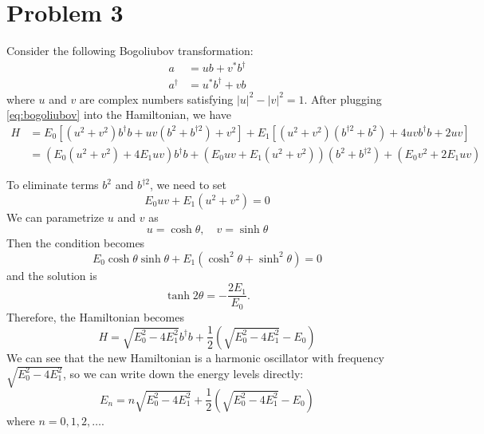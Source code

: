\documentclass{article}
\begin{document}
\section*{Problem 3}
Consider the following Bogoliubov transformation:
\begin{subequations}\label{eq:bogoliubov}
    \begin{align}
        a&=ub+v^*b^\dagger\\
        a^\dagger&=u^*b^\dagger+vb
    \end{align}
\end{subequations}
where $u$ and $v$ are complex numbers satisfying $|u|^2-|v|^2=1$.
After plugging \cref{eq:bogoliubov} into the Hamiltonian, we have
\begin{equation}
    \begin{split}
        H&=E_0\left[(u^2+v^2)b^\dagger b+uv(b^2+b^{\dagger 2})+v^2\right]+E_1\left[(u^2+v^2)(b^{\dagger 2}+b^2)+4uvb^\dagger b+2uv\right]\\
         &= (E_0(u^2+v^2)+4E_1uv)b^\dagger b+(E_0uv+E_1(u^2+v^2))(b^2+b^{\dagger 2})+(E_0v^2+2E_1uv)
    \end{split}
\end{equation}

To eliminate terms $b^2$ and $b^{\dagger 2}$, we need to set
\begin{equation}
    E_0uv+E_1(u^2+v^2)=0
\end{equation}
We can parametrize $u$ and $v$ as
\begin{equation}
    u=\cosh\theta, \quad v=\sinh\theta
\end{equation}
Then the condition becomes
\begin{equation}
    E_0\cosh\theta\sinh\theta+E_1(\cosh^2\theta+\sinh^2\theta)=0
\end{equation}
and the solution is
\begin{equation}
    \tanh 2\theta=-\frac{2E_1}{E_0}.
\end{equation}
Therefore, the Hamiltonian becomes
\begin{equation}
    H=\sqrt{E_0^2-4E_1^2}b^\dagger b+\frac{1}{2}(\sqrt{E_0^2-4E_1^2}-E_0)
\end{equation}
We can see that the new Hamiltonian is a harmonic oscillator with frequency $\sqrt{E_0^2-4E_1^2}$, so we can write down the energy levels directly:
\begin{equation}
    E_n=n\sqrt{E_0^2-4E_1^2}+\frac{1}{2}(\sqrt{E_0^2-4E_1^2}-E_0)
\end{equation}
where $n=0,1,2,\ldots$.
\end{document}
